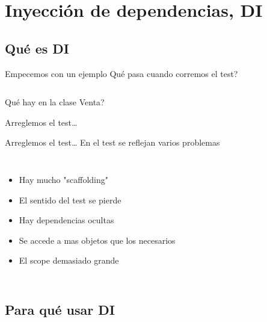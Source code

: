 \section{Inyecci\'on de dependencias, DI}

\subsection{Qu\'e es DI}
\begin{frame}[t]{Empecemos con un ejemplo}
\textquestiondown Qu\'e pasa cuando corremos el test?
\begin{columns}
	
\end{columns}
\end{frame}


\begin{frame}[shrink=2,t]{\textquestiondown Qu\'e hay en la clase Venta?}

\end{frame}

\begin{frame}[shrink=2]{Arreglemos el test\ldots}

\end{frame}

\begin{frame}{Arreglemos el test\ldots}
En el test se reflejan varios problemas
\bigskip
\begin{columns}[onlytextwidth]
	\begin{itemize}
		\item Hay mucho "scaffolding"
		\item El sentido del test se pierde
		\item Hay dependencias ocultas
		\item Se accede a mas objetos que los necesarios
		\item El scope demasiado grande
	\end{itemize}
\end{columns}
\end{frame}

\subsection{Para qu\'e usar DI}

